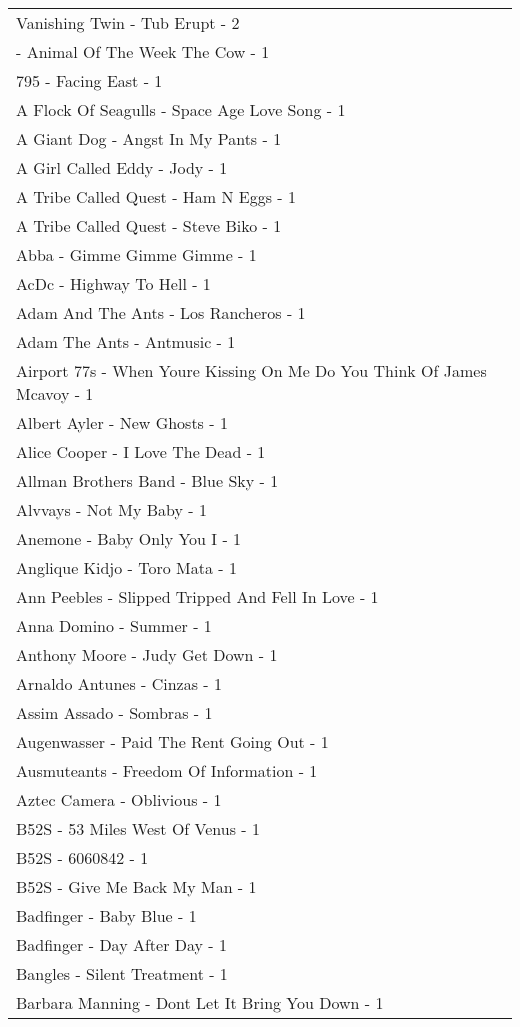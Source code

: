 \documentclass[
]{article}
\begin{document}
\begin{longtable}{l}
Vanishing Twin - Tub Erupt - 2 \\ 
 - Animal Of The Week The Cow - 1 \\ 
795 - Facing East - 1 \\ 
A Flock Of Seagulls - Space Age Love Song - 1 \\ 
A Giant Dog - Angst In My Pants - 1 \\ 
A Girl Called Eddy - Jody - 1 \\ 
A Tribe Called Quest - Ham N Eggs - 1 \\ 
A Tribe Called Quest - Steve Biko - 1 \\ 
Abba - Gimme Gimme Gimme - 1 \\ 
AcDc - Highway To Hell - 1 \\ 
Adam And The Ants - Los Rancheros - 1 \\ 
Adam The Ants - Antmusic - 1 \\ 
Airport 77s - When Youre Kissing On Me Do You Think Of James Mcavoy - 1 \\ 
Albert Ayler - New Ghosts - 1 \\ 
Alice Cooper - I Love The Dead - 1 \\ 
Allman Brothers Band - Blue Sky - 1 \\ 
Alvvays - Not My Baby - 1 \\ 
Anemone - Baby Only You I - 1 \\ 
Anglique Kidjo - Toro Mata - 1 \\ 
Ann Peebles - Slipped Tripped And Fell In Love - 1 \\ 
Anna Domino - Summer - 1 \\ 
Anthony Moore - Judy Get Down - 1 \\ 
Arnaldo Antunes - Cinzas - 1 \\ 
Assim Assado - Sombras - 1 \\ 
Augenwasser - Paid The Rent Going Out - 1 \\ 
Ausmuteants - Freedom Of Information - 1 \\ 
Aztec Camera - Oblivious - 1 \\ 
B52S - 53 Miles West Of Venus - 1 \\ 
B52S - 6060842 - 1 \\ 
B52S - Give Me Back My Man - 1 \\ 
Badfinger - Baby Blue - 1 \\ 
Badfinger - Day After Day - 1 \\ 
Bangles - Silent Treatment - 1 \\ 
Barbara Manning - Dont Let It Bring You Down - 1 \\ 

\end{longtable}
\end{document}
